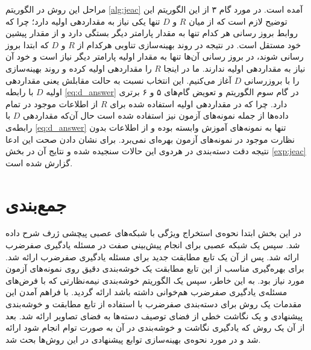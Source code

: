 مراحل این روش در الگوریتم \ref{alg:jeac} آمده است. در مورد گام ۳ از این الگوریتم این توضیح لازم است که از میان $R$ و $D$ تنها یکی نیاز به مقداردهی اولیه دارد؛ چرا که روابط بروز رسانی هر کدام تنها به مقدار پارامتر دیگر بستگی دارد و از مقدار پیشین خود مستقل است. در نتیجه در روند بهینه‌سازی تناوبی هرکدام از $R$ و $D$ که ابتدا بروز رسانی شوند، در بروز رسانی آن‌ها تنها به مقدار اولیه پارامتر دیگر نیاز است و خود آن نیاز به مقداردهی اولیه ندارند. ما در اینجا $R$ را مقداردهی اولیه کرده و روند بهینه‌سازی را با بروزرسانی $D$ آغاز می‌کنیم. این انتخاب نسبت به حالت مقابلش یعنی مقداردهی اولیه $D$ با رابطه
\eqref{eq:d_answer}
 در گام سوم الگوریتم و تعویض گام‌های ۵ و ۶ برتری دارد. چرا که در مقداردهی اولیه استفاده شده برای $R$ از اطلاعات موجود در تمام داده‌ها از جمله نمونه‌های آزمون نیز استفاده شده است حال آن‌که مقداردهی $D$ با رابطه‌ی \eqref{eq:d_answer} تنها به نمونه‌های آموزش وابسته بوده و از اطلاعات بدون نظارت موجود در نمونه‌های آزمون بهره‌ای نمی‌برد. برای نشان دادن صحت این ادعا نتیجه دقت دسته‌بندی در هردوی این حالات سنجیده شده و نتایج آن در بخش  \ref{exp:jeac} گزارش شده است. 
\section{جمع‌بندی}
در این بخش ابتدا نحوه‌ی استخراج ویژگی با شبکه‌های عصبی پیچشی ژرف شرح داده شد. سپس یک شبکه عصبی برای انجام پیش‌بینی صفت در مسئله یادگیری صفرضرب ارائه شد. پس از آن یک تابع مطابقت جدید برای مسئله یادگیری صفرضرب ارائه شد. برای بهره‌گیری مناسب از این تابع مطابقت یک خوشه‌بندی دقیق روی نمونه‌های آزمون مورد نیاز بود. به این خاطر، سپس یک الگوریتم خوشه‌بندی نیمه‌نظارتی که با فرض‌های مسئله‌ی یادگیری صفرضرب هم‌خوانی داشته باشد ارائه گردید. با فراهم آمدن این مقدمات یک روش برای دسته‌بندی صفرضرب با استفاده از تابع مطابقت و خوشه‌بندی پیشنهادی و یک نگاشت خطی از فضای توصیف دسته‌ها به فضای تصاویر ارائه شد. بعد از آن یک روش که یادگیری نگاشت و خوشه‌بندی در آن  به صورت توام انجام شود ارائه شد و در مورد نحوه‌ی بهینه‌سازی توابع پیشنهادی در این روش‌ها بحث شد.
